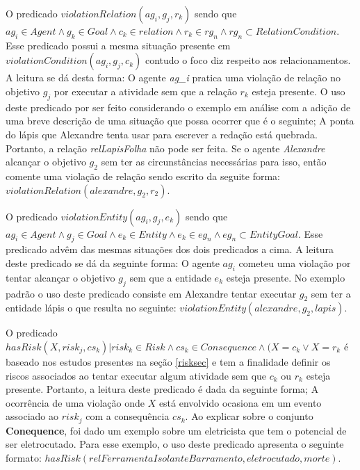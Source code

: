 O predicado $ violationRelation(ag_i,g_j,r_k) $ sendo que $ ag_i \in Agent \wedge g_k \in Goal \wedge c_k \in relation \wedge r_k  \in rg_n \wedge rg_n \subset RelationCondition $. Esse predicado possui a mesma situação presente em $ violationCondition(ag_i,g_j,c_k) $ contudo o foco diz respeito aos relacionamentos. A leitura se dá desta forma: O agente \textit{ag\_i} pratica uma violação de relação no objetivo $g_j$ por executar a atividade sem que a relação $r_k$ esteja presente. O uso deste predicado por ser feito considerando o exemplo em análise com a adição de uma breve descrição de uma situação que possa ocorrer que é o seguinte; A ponta do lápis que Alexandre tenta usar para escrever a redação está quebrada. Portanto, a relação \textit{relLapisFolha} não pode ser feita. Se o agente \textit{Alexandre} alcançar o objetivo $g_2$ sem ter as circunstâncias necessárias para isso, então comente uma violação de relação sendo escrito da seguite forma: $violationRelation(alexandre,g_2,r_2)$.

O predicado $ violationEntity(ag_i,g_j,e_k) $ sendo que $ag_i \in Agent \wedge g_j \in Goal \wedge e_k \in Entity \wedge e_k \in eg_n \wedge eg_n \subset EntityGoal $. Esse predicado advêm das mesmas situações dos dois predicados a cima. A leitura deste predicado se dá da seguinte forma: O agente $ag_i$ cometeu uma violação por tentar alcançar o objetivo $g_j$ sem que a entidade $e_k$ esteja presente. No exemplo padrão o uso deste predicado consiste em Alexandre tentar executar $g_2$ sem ter a entidade lápis o que resulta no seguinte: $violationEntity(alexandre, g_2, lapis)$.

O predicado $ hasRisk(X, risk_j, cs_k) | risk_k \in Risk \wedge cs_k \in Consequence \wedge (X = c_k \vee X = r_k $ é baseado nos estudos presentes na seção \ref{risksec} e tem a finalidade definir os riscos associados ao tentar executar algum atividade sem que $c_k$ ou $r_k$ esteja presente. Portanto, a leitura deste predicado é dada da seguinte forma; A ocorrência de uma violação 
onde $X$ está envolvido ocasiona em um evento associado ao $risk_j$ com a consequência $cs_k$. Ao explicar sobre o conjunto \textbf{Conequence}, foi dado um exemplo sobre um eletricista que tem o potencial de ser eletrocutado. Para esse exemplo, o uso deste predicado apresenta o seguinte formato: $hasRisk(relFerramentaIsolanteBarramento, eletrocutado, morte)$.

